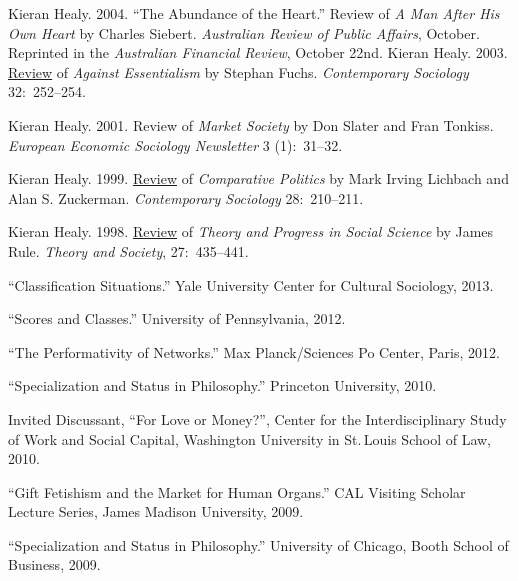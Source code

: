 \documentclass[11pt,article,oneside]{memoir}
\begin{document}
\ind  Kieran Healy. 2004. ``The Abundance of the Heart.'' Review of \emph{A Man After His Own Heart} by Charles
Siebert. \emph{Australian Review of Public Affairs}, October. Reprinted in the
\emph{Australian Financial Review}, October 22nd.
\ind  Kieran Healy. 2003.
\href{http://links.jstor.org/sici?sici=0094-3061%28200303%2932%3A2%3C252%3AAEATOC%3E2.0.CO%3B2-F}{Review} of \emph{Against Essentialism} by Stephan Fuchs.
\emph{Contemporary Sociology} 32:~252--254.

\ind  Kieran Healy. 2001. Review of \emph{Market Society} by Don Slater and Fran Tonkiss. \emph{European Economic Sociology Newsletter} 3 (1):~31--32.


\ind  Kieran Healy. 1999. \href{http://links.jstor.org/sici?sici=0094-3061%28199903%2928%3A2%3C210%3ACPRCAS%3E2.0.CO%3B2-C}{Review} of \emph{Comparative Politics} by Mark Irving Lichbach and Alan S.
Zuckerman. \emph{Contemporary Sociology} 28:~210--211.


\ind  Kieran Healy. 1998. \href{http://www.kieranhealy.org/files/reviews/rule.pdf}{Review} of \emph{Theory and Progress in Social Science} by James Rule.  \emph{Theory
  and Society}, 27:~435--441.
 
 \bigskip

\medskip


\ind ``Classification Situations.'' Yale University Center for Cultural Sociology, 2013.
 
\ind ``Scores and Classes.'' University of Pennsylvania, 2012.

\ind ``The Performativity of Networks.'' Max Planck/Sciences Po Center, Paris, 2012. 
 
\ind ``Specialization and Status in Philosophy.'' Princeton University, 2010. 

\ind Invited Discussant, ``For Love or Money?'', Center for the Interdisciplinary Study of Work and Social Capital, Washington University in St.\,Louis School of Law, 2010. 

\ind ``Gift Fetishism and the Market for Human Organs.'' CAL Visiting Scholar Lecture Series, James Madison University, 2009. 

\ind ``Specialization and Status in Philosophy.'' University of Chicago, Booth School of Business, 2009. 
\end{document}
